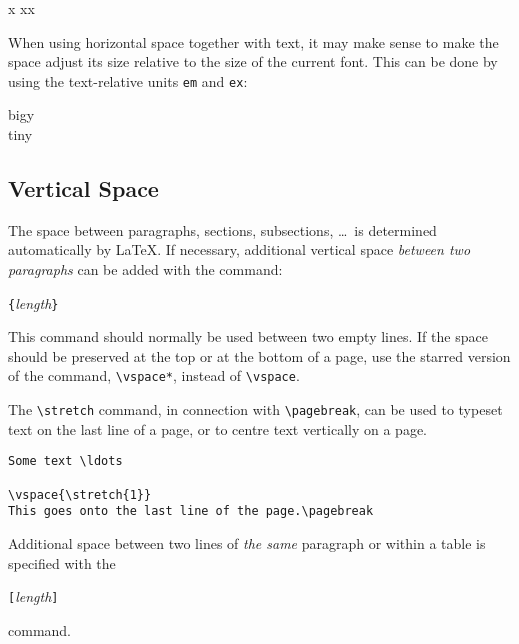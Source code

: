 \begin{example}
x
xx
\end{example}

When using horizontal space together with text, it may make sense to make
the space adjust its size relative to the size of the current font.
This can be done by using the text-relative units \texttt{em} and
\texttt{ex}:

\begin{example}
{\Large{}big\hspace{1em}y}\\
{\tiny{}tin\hspace{1em}y}
\end{example}
 
\subsection{Vertical Space}
The space between paragraphs, sections, subsections, \ldots\ is
determined automatically by \LaTeX. If necessary, additional vertical
space \emph{between two paragraphs} can be added with the command:
\begin{lscommand}
\verb|{|\emph{length}\verb|}|
\end{lscommand}

This command should normally be used between two empty lines.  If the
space should be preserved at the top or at the bottom of a page, use
the starred version of the command, \verb|\vspace*|, instead of \verb|\vspace|.

The \verb|\stretch| command, in connection with \verb|\pagebreak|, can
be used to typeset text on the last line of a page, or to centre text
vertically on a page.
\begin{code}
\begin{verbatim}
Some text \ldots

\vspace{\stretch{1}}
This goes onto the last line of the page.\pagebreak
\end{verbatim}
\end{code}

Additional space between two lines of \emph{the same} paragraph or
within a table is specified with the
\begin{lscommand}
\ci{\bs}\verb|[|\emph{length}\verb|]|
\end{lscommand}
\noindent command. 

